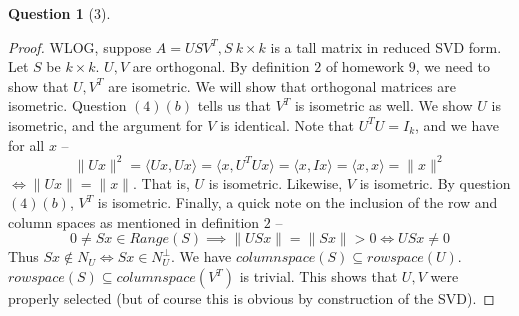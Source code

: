 \documentclass[11pt]{article}
\theoremstyle{quest}
\newtheorem*{question}{Question}
\begin{document}
\begin{question}[3]
\end{question}
\begin{proof}
WLOG, suppose $A = USV^T, S\ k \times k$ is a tall matrix in reduced SVD form. Let $S$ be $k \times k$. $U, V$ are orthogonal. By definition $2$ of homework $9$, we need to show that $U, V^T$ are isometric. We will show that orthogonal matrices are isometric. Question $(4)(b)$ tells us that $V^T$ is isometric as well.
We show $U$ is isometric, and the argument for $V$ is identical. Note that $U^TU = I_k$, and we have for all $x$ --
$$\|Ux\|^2 = \langle Ux, Ux \rangle = \langle x, U^TUx \rangle = \langle x, Ix \rangle =\langle x, x \rangle = \|x\|^2$$
$\iff \|Ux\| = \|x\|$. That is, $U$ is isometric. Likewise, $V$ is isometric. By question $(4)(b)$, $V^T$ is isometric. Finally, a quick note on the inclusion of the row and column spaces as mentioned in definition $2$ --
$$0 \ne Sx \in Range(S) \implies \|USx\| = \|Sx\| > 0 \iff USx \ne 0$$
Thus $Sx \not\in N_U \iff Sx \in N_U^{\perp}$. We have $columnspace(S) \subseteq rowspace(U)$.
\\$rowspace(S) \subseteq columnspace(V^T)$ is trivial. This shows that $U, V$ were properly selected (but of course this is obvious by construction of the SVD).
\end{proof}
\end{document}
